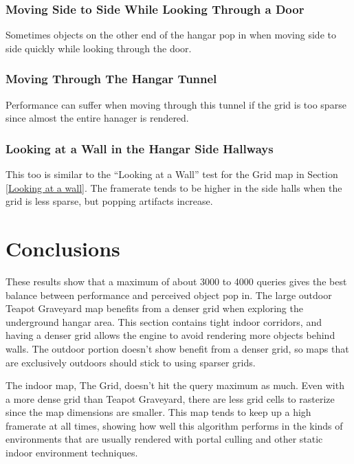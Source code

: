 \documentclass[12pt]{ucthesis}
\begin{document}
\subsubsection{Moving Side to Side While Looking Through a Door}
\label{Moving Side to Side While Looking Through a Door}

Sometimes objects on the other end of the hangar pop in when moving side to side quickly while looking through the door.

\subsubsection{Moving Through The Hangar Tunnel}
\label{Moving Through The Hangar Tunnel}

Performance can suffer when moving through this tunnel if the grid is too sparse since almost the entire hanager is rendered.

\subsubsection{Looking at a Wall in the Hangar Side Hallways}
\label{Looking at a Wall in the Hangar Side Hallways}

This too is similar to the ``Looking at a Wall'' test for the Grid map in Section \ref{Looking at a wall}.
The framerate tends to be higher in the side halls when the grid is less sparse, but popping artifacts increase.

\section{Conclusions}
\label{conclusions}
These results show that a maximum of about 3000 to 4000 queries gives the best balance between performance and perceived object pop in.
The large outdoor Teapot Graveyard map benefits from a denser grid when exploring the underground hangar area.
This section contains tight indoor corridors, and having a denser grid allows the engine to avoid rendering more objects behind walls.
The outdoor portion doesn't show benefit from a denser grid, so maps that are exclusively outdoors should stick to using sparser grids.

The indoor map, The Grid, doesn't hit the query maximum as much.
Even with a more dense grid than Teapot Graveyard, there are less grid cells to rasterize since the map dimensions are smaller.
This map tends to keep up a high framerate at all times, showing how well this algorithm performs in the kinds of environments that are usually rendered with portal culling and other static indoor environment techniques.
\end{document}

